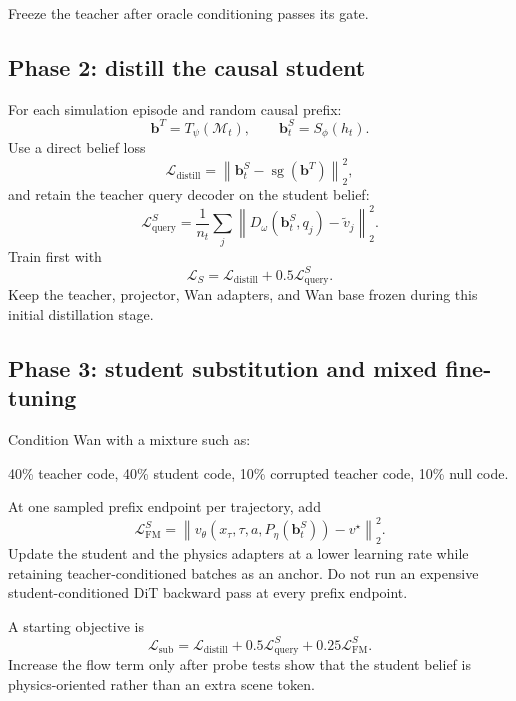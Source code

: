 \documentclass[11pt]{article}
\newcommand{\bvec}{\bm b}
\newcommand{\sg}{\operatorname{sg}}
\newcommand{\meta}{\mathcal M}
\begin{document}
Freeze the teacher after oracle conditioning passes its gate.

\subsection{Phase 2: distill the causal student}

For each simulation episode and random causal prefix:
\begin{equation}
  \bvec^T=T_\psi(\meta_t),
  \qquad
  \bvec_t^S=S_\phi(h_t).
\end{equation}
Use a direct belief loss
\begin{equation}
  \mathcal L_{\mathrm{distill}}
  =\left\|\bvec_t^S-\sg(\bvec^T)\right\|_2^2,
\end{equation}
and retain the teacher query decoder on the student belief:
\begin{equation}
  \mathcal L_{\mathrm{query}}^S
  =\frac{1}{n_t}\sum_j
  \left\|D_\omega(\bvec_t^S,q_j)-\widetilde v_j\right\|_2^2.
\end{equation}
Train first with
\begin{equation}
  \mathcal L_S=
  \mathcal L_{\mathrm{distill}}+0.5\mathcal L_{\mathrm{query}}^S.
\end{equation}
Keep the teacher, projector, Wan adapters, and Wan base frozen during this
initial distillation stage.

\subsection{Phase 3: student substitution and mixed fine-tuning}

Condition Wan with a mixture such as:
\begin{center}
40\% teacher code, 40\% student code, 10\% corrupted teacher code, 10\% null code.
\end{center}
At one sampled prefix endpoint per trajectory, add
\begin{equation}
  \mathcal L_{\mathrm{FM}}^S
  =\left\|v_\theta(x_\tau,\tau,a,P_\eta(\bvec_t^S))-v^\star\right\|_2^2.
\end{equation}
Update the student and the physics adapters at a lower learning rate while
retaining teacher-conditioned batches as an anchor.  Do not run an expensive
student-conditioned DiT backward pass at every prefix endpoint.

A starting objective is
\begin{equation}
  \mathcal L_{\mathrm{sub}}
  =\mathcal L_{\mathrm{distill}}
  +0.5\mathcal L_{\mathrm{query}}^S
  +0.25\mathcal L_{\mathrm{FM}}^S.
\end{equation}
Increase the flow term only after probe tests show that the student belief is
physics-oriented rather than an extra scene token.
\end{document}
